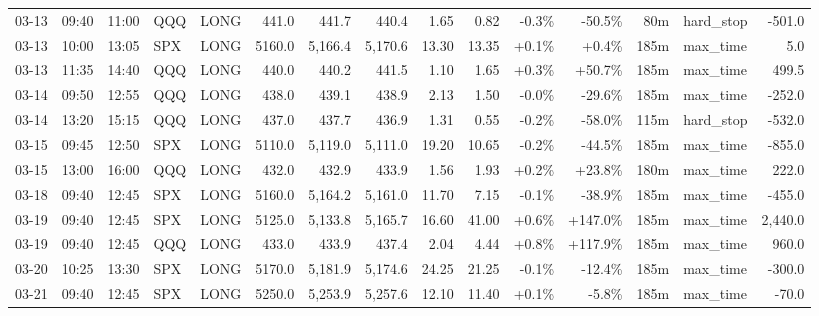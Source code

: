 \documentclass[11pt,a4paper,twoside]{article}
\begin{document}
\begin{landscape}
\begin{center}
\begin{longtable}{>{\color{txtmain}}l l l l l r r r r r r r r >{\color{txtmain}}l r}
03-13 & 09:40 & 11:00 & QQQ & LONG & 441.0 & 441.7 & 440.4 & 1.65 & 0.82 & \textcolor{lossred}{-0.3\%} & \textcolor{lossred}{-50.5\%} & 80m & hard\_stop & \textcolor{lossred}{-501.0} \\
03-13 & 10:00 & 13:05 & SPX & LONG & 5160.0 & 5,166.4 & 5,170.6 & 13.30 & 13.35 & \textcolor{wingreen}{+0.1\%} & \textcolor{wingreen}{+0.4\%} & 185m & max\_time & \textcolor{wingreen}{5.0} \\
03-13 & 11:35 & 14:40 & QQQ & LONG & 440.0 & 440.2 & 441.5 & 1.10 & 1.65 & \textcolor{wingreen}{+0.3\%} & \textcolor{wingreen}{+50.7\%} & 185m & max\_time & \textcolor{wingreen}{499.5} \\
03-14 & 09:50 & 12:55 & QQQ & LONG & 438.0 & 439.1 & 438.9 & 2.13 & 1.50 & \textcolor{lossred}{-0.0\%} & \textcolor{lossred}{-29.6\%} & 185m & max\_time & \textcolor{lossred}{-252.0} \\
03-14 & 13:20 & 15:15 & QQQ & LONG & 437.0 & 437.7 & 436.9 & 1.31 & 0.55 & \textcolor{lossred}{-0.2\%} & \textcolor{lossred}{-58.0\%} & 115m & hard\_stop & \textcolor{lossred}{-532.0} \\
03-15 & 09:45 & 12:50 & SPX & LONG & 5110.0 & 5,119.0 & 5,111.0 & 19.20 & 10.65 & \textcolor{lossred}{-0.2\%} & \textcolor{lossred}{-44.5\%} & 185m & max\_time & \textcolor{lossred}{-855.0} \\
03-15 & 13:00 & 16:00 & QQQ & LONG & 432.0 & 432.9 & 433.9 & 1.56 & 1.93 & \textcolor{wingreen}{+0.2\%} & \textcolor{wingreen}{+23.8\%} & 180m & max\_time & \textcolor{wingreen}{222.0} \\
03-18 & 09:40 & 12:45 & SPX & LONG & 5160.0 & 5,164.2 & 5,161.0 & 11.70 & 7.15 & \textcolor{lossred}{-0.1\%} & \textcolor{lossred}{-38.9\%} & 185m & max\_time & \textcolor{lossred}{-455.0} \\
03-19 & 09:40 & 12:45 & SPX & LONG & 5125.0 & 5,133.8 & 5,165.7 & 16.60 & 41.00 & \textcolor{wingreen}{+0.6\%} & \textcolor{wingreen}{+147.0\%} & 185m & max\_time & \textcolor{wingreen}{2,440.0} \\
03-19 & 09:40 & 12:45 & QQQ & LONG & 433.0 & 433.9 & 437.4 & 2.04 & 4.44 & \textcolor{wingreen}{+0.8\%} & \textcolor{wingreen}{+117.9\%} & 185m & max\_time & \textcolor{wingreen}{960.0} \\
03-20 & 10:25 & 13:30 & SPX & LONG & 5170.0 & 5,181.9 & 5,174.6 & 24.25 & 21.25 & \textcolor{lossred}{-0.1\%} & \textcolor{lossred}{-12.4\%} & 185m & max\_time & \textcolor{lossred}{-300.0} \\
03-21 & 09:40 & 12:45 & SPX & LONG & 5250.0 & 5,253.9 & 5,257.6 & 12.10 & 11.40 & \textcolor{wingreen}{+0.1\%} & \textcolor{lossred}{-5.8\%} & 185m & max\_time & \textcolor{lossred}{-70.0} \\

\end{longtable}
\end{center}
\end{landscape}
\end{document}
